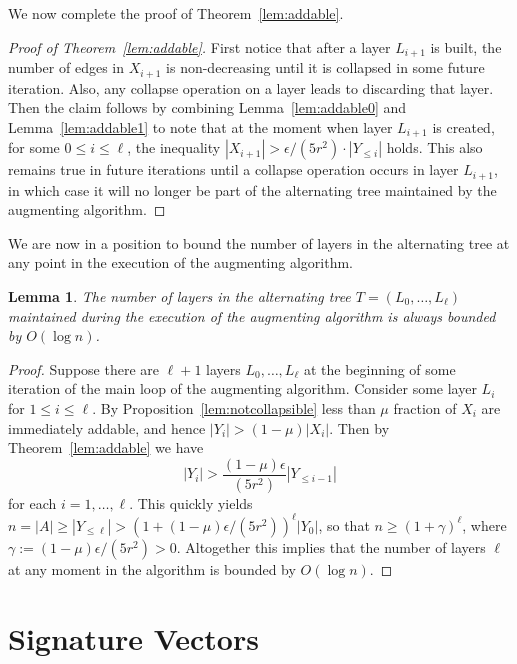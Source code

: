 \documentclass[11pt]{article}
\newtheorem{lemma}[theorem]{Lemma}
\theoremstyle{definition}
\theoremstyle{remark}
\begin{document}
We now complete the proof of Theorem~\ref{lem:addable}.

\begin{proof}[Proof of Theorem~\ref{lem:addable}]
  First notice that after a layer $L_{i+1}$ is built, the number of
  edges in $X_{i+1}$ is non-decreasing until it is collapsed in some
  future iteration. Also, any collapse operation on a layer leads to
  discarding that layer. Then the claim follows by combining
  Lemma~\ref{lem:addable0} and Lemma~\ref{lem:addable1} to note that
  at the moment when layer $L_{i+1}$ is created, for some $0 \leq i
  \leq \ell$, the inequality $|X_{i+1}| > \epsilon/(5r^2) \cdot |Y_{\leq i}|$ holds. This also remains true in future iterations until a collapse operation occurs in layer $L_{i+1}$, in which case it will no longer be part of the alternating tree maintained by the augmenting algorithm. 
\end{proof}

We are now in a position to bound the number of layers in the alternating tree at any point in the execution of the augmenting algorithm.

\begin{lemma}\label{lem:layers}
  The number of layers in the alternating tree $T=(L_0,\dots,L_\ell)$ maintained during the execution of the augmenting algorithm is always bounded by $O(\log n)$.
\end{lemma}

\begin{proof}
Suppose there are $\ell+1$ layers $L_0,\dots,L_\ell$ at the beginning of some iteration of the main loop of the augmenting algorithm. Consider some layer $L_i$ for $1 \leq i \leq \ell$. By Proposition~\ref{lem:notcollapsible} less than $\mu$ fraction of $X_{i}$ are immediately addable, and hence $|Y_{i}| > (1-\mu)|X_{i}|$. Then by Theorem~\ref{lem:addable} we have \[|Y_i| > \frac{(1-\mu)\epsilon}{(5r^2)} |Y_{\leq i-1}|\] for each $i = 1,\dots, \ell$. This quickly yields $n = |A| \geq |Y_{\leq \ell}| > (1 + (1-\mu)\epsilon/(5r^2))^\ell|Y_0|$, so that $n \geq (1 +\gamma)^\ell$, where $\gamma := (1-\mu)\epsilon/(5r^2)  > 0$. Altogether this implies that the number of layers $\ell$ at any moment in the algorithm is bounded by $O(\log n)$.
\end{proof}

\section{Signature Vectors}
\end{document}
